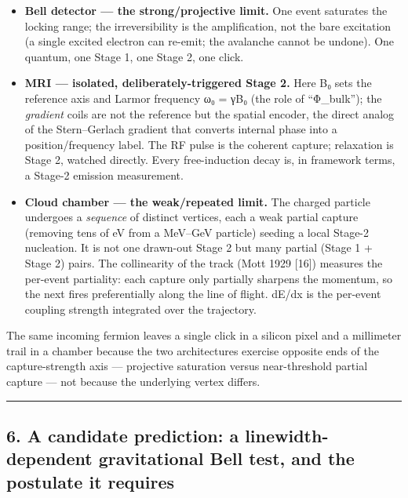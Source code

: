 \documentclass[
]{article}
\providecommand{\tightlist}{%
  \setlength{\itemsep}{0pt}\setlength{\parskip}{0pt}}
\begin{document}
\begin{itemize}
\tightlist
\item
  \textbf{Bell detector --- the strong/projective limit.} One event
  saturates the locking range; the irreversibility is the amplification,
  not the bare excitation (a single excited electron can re-emit; the
  avalanche cannot be undone). One quantum, one Stage 1, one Stage 2,
  one click.
\item
  \textbf{MRI --- isolated, deliberately-triggered Stage 2.} Here B₀
  sets the reference axis and Larmor frequency ω₀ = γB₀ (the role of
  ``Φ\_bulk''); the \emph{gradient} coils are not the reference but the
  spatial encoder, the direct analog of the Stern--Gerlach gradient that
  converts internal phase into a position/frequency label. The RF pulse
  is the coherent capture; relaxation is Stage 2, watched directly.
  Every free-induction decay is, in framework terms, a Stage-2 emission
  measurement.
\item
  \textbf{Cloud chamber --- the weak/repeated limit.} The charged
  particle undergoes a \emph{sequence} of distinct vertices, each a weak
  partial capture (removing tens of eV from a MeV--GeV particle) seeding
  a local Stage-2 nucleation. It is not one drawn-out Stage 2 but many
  partial (Stage 1 + Stage 2) pairs. The collinearity of the track (Mott
  1929 {[}16{]}) measures the per-event partiality: each capture only
  partially sharpens the momentum, so the next fires preferentially
  along the line of flight. dE/dx is the per-event coupling strength
  integrated over the trajectory.
\end{itemize}

The same incoming fermion leaves a single click in a silicon pixel and a
millimeter trail in a chamber because the two architectures exercise
opposite ends of the capture-strength axis --- projective saturation
versus near-threshold partial capture --- not because the underlying
vertex differs.

\begin{center}\rule{0.5\linewidth}{0.5pt}\end{center}

\subsection{6. A candidate prediction: a linewidth-dependent
gravitational Bell test, and the postulate it
requires}\label{a-candidate-prediction-a-linewidth-dependent-gravitational-bell-test-and-the-postulate-it-requires}
\end{document}
